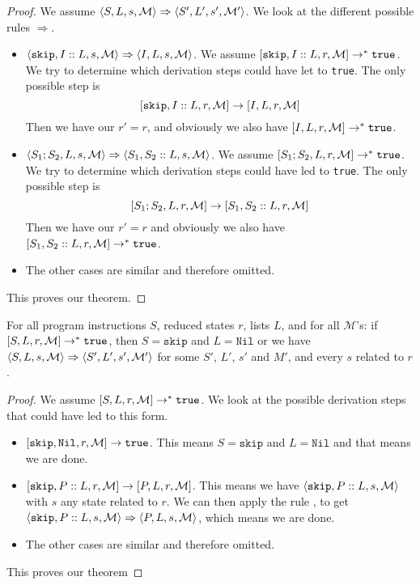 \begin{proof}
We assume $\langle S, L, s, \mathcal{M} \rangle \Rightarrow \langle S', L', s', \mathcal{M'} \rangle$. We look at the different possible rules $\Rightarrow$. 
\begin{itemize}[noitemsep]
    \item $\langle \texttt{skip}, I::L, s, \mathcal{M} \rangle \Rightarrow \langle I, L, s, \mathcal{M} \rangle$. We assume $[ \texttt{skip}, I::L, r, \mathcal{M} ] \to ^* \texttt{true}$. We try to determine which derivation steps could have let to \texttt{true}. The only possible step is 
    $$[ \texttt{skip}, I::L, r, \mathcal{M} ]\to [ I, L, r, \mathcal{M} ]$$
    Then we have our $r' = r$, and obviously we also have $[ I, L, r, \mathcal{M} ] \to^* \texttt{true}$.
    \item $\langle S_1; S_2, L, s, \mathcal{M} \rangle \Rightarrow \langle S_1, S_2::L, s, \mathcal{M} \rangle$. We assume $[ S_1; S_2, L, r, \mathcal{M} ] \to ^* \texttt{true}$. We try to determine which derivation steps could have led to \texttt{true}. The only possible step is 
    $$[ S_1; S_2, L, r, \mathcal{M} ] \to [ S_1, S_2::L, r, \mathcal{M} ]$$
    Then we have our $r' = r$ and obviously we also have $[ S_1, S_2::L, r, \mathcal{M} ] \to^* \texttt{true}$.
    \item The other cases are similar and therefore omitted.
\end{itemize}
This proves our theorem.
\end{proof}


\begin{theorem}
\label{progressb}
For all program instructions $S$, reduced states $r$, lists $L$, and for all $\mathcal{M}$'s: if $[ S, L, r, \mathcal{M} ] \to^* \texttt{true}$, then $S = \texttt{skip}$ and $L = \texttt{Nil}$ or we have $\langle S, L, s, \mathcal{M} \rangle \Rightarrow \langle S', L', s', \mathcal{M'} \rangle$ for some $S'$, $L'$, $s'$ and $M'$, and every $s$ related to $r$.
\end{theorem}

\begin{proof}
We assume $[ S, L, r, \mathcal{M} ] \to^* \texttt{true}$. We look at the possible derivation steps that could have led to this form. 
\begin{itemize}[noitemsep]
    \item $[ \texttt{skip}, \texttt{Nil}, r, \mathcal{M} ] \to \texttt{true}$. This means $S = \texttt{skip}$ and $L = \texttt{Nil}$ and that means we are done.
    \item $[ \texttt{skip}, P::L, r, \mathcal{M} ] \to [ P, L, r, \mathcal{M} ]$. This means we have $\langle \texttt{skip}, P::L, s, \mathcal{M} \rangle$ with $s$ any state related to $r$. We can then apply the rule \loadsos, to get $\langle \texttt{skip}, P::L, s, \mathcal{M} \rangle \Rightarrow \langle P, L, s, \mathcal{M} \rangle$, which means we are done.
    \item The other cases are similar and therefore omitted.
\end{itemize}
This proves our theorem
\end{proof}




